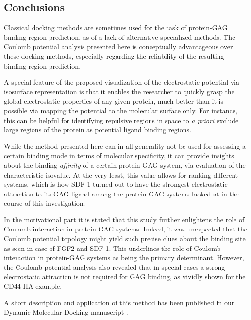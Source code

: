 \subsection{Conclusions}
\label{bspred:general_conclusions}

Classical docking methods are sometimes used for the task of protein-GAG binding
region prediction, as of a lack of alternative specialized methods. The Coulomb
potential analysis presented here is conceptually advantageous over these
docking methods, especially regarding the reliability of the resulting binding
region prediction.

A special feature of the proposed visualization of the electrostatic potential
via isosurface representation is that it enables the researcher to quickly grasp
the global electrostatic properties of any given protein, much better than it is
possible via mapping the potential to the molecular surface only. For instance,
this can be helpful for identifying repulsive regions in space to \textit{a
priori} exclude large regions of the protein as potential ligand binding
regions.

While the method presented here can in all generality not be used for assessing
a certain binding mode in terms of molecular specificity, it can provide
insights about the binding \textit{affinity} of a certain protein-GAG system,
via evaluation of the characteristic isovalue. At the very least, this value
allows for ranking different systems, which is how SDF-1 turned out to have the
strongest electrostatic attraction to its GAG ligand among the protein-GAG
systems looked at in the course of this investigation.

In the motivational part it is stated that this study further enlightens the
role of Coulomb interaction in protein-GAG systems. Indeed, it was unexpected
that the Coulomb potential topology might yield such precise clues about the
binding site as seen in case of FGF2 and SDF-1. This underlines the role of
Coulomb interaction in protein-GAG systems as being the primary determinant.
However, the Coulomb potential analysis also revealed that in special cases a
strong electrostatic attraction is not required for GAG binding, as vividly
shown for the CD44-HA example.

A short description and application of this method has been published in our
Dynamic Molecular Docking manuscript \cite{dmd_samsonov_gehrcke_2014}.


